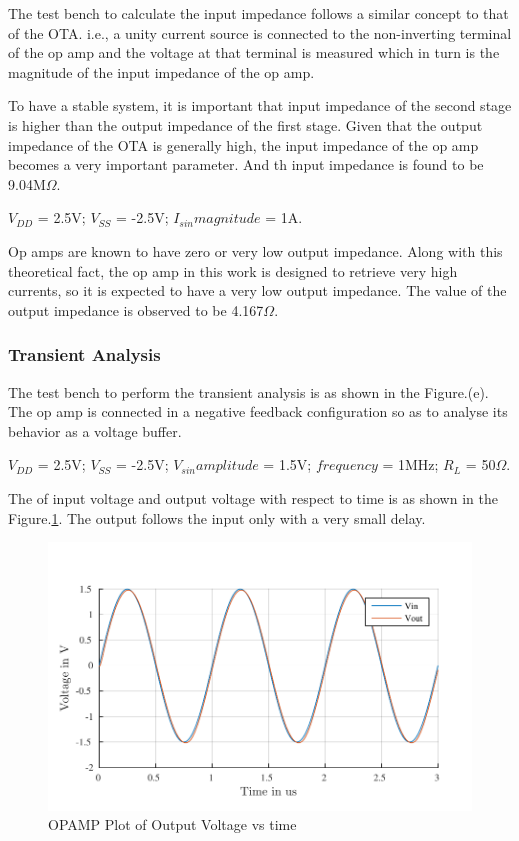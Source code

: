 The test bench to calculate the input impedance follows a similar concept to that of the OTA. i.e., a unity current source is connected to the non-inverting terminal of the op amp and the voltage at that terminal is measured which in turn is the magnitude of the input impedance of the op amp.

To have a stable system, it is important that input impedance of the second stage is higher than the output impedance of the first stage. Given that the output impedance of the OTA is generally high, the input impedance of the op amp becomes a very important parameter. And th input impedance is found to be 9.04M$\Omega$.

$V_{DD}$ = 2.5V; $V_{SS}$ = -2.5V; $I_{sin} magnitude $ = 1A.

Op amps are known to have zero or very low output impedance. Along with this theoretical fact, the op amp in this work is designed to retrieve very high currents, so it is expected to have a very low output impedance. The value of the output impedance is observed to be 4.167$\Omega$.

\subsubsection{Transient Analysis}
The test bench to perform the transient analysis is as shown in the Figure.(e). The op amp is connected in a negative feedback configuration so as to analyse its behavior as a voltage buffer.

$V_{DD}$ = 2.5V; $V_{SS}$ = -2.5V; $V_{sin} amplitude $ = 1.5V; $frequency$ = 1MHz; $R_L$ = 50$\Omega$.

The of input voltage and output voltage with respect to time is as shown in the Figure.\ref{fig:OPAMP_Vout}. The output follows the input only with a very small delay.

\begin{figure} [H]
\centering
\includegraphics[scale=1]{Figures/Plots/OPAMP_Buffer.pdf}
\caption{OPAMP Plot of Output Voltage vs time}
\label{fig:OPAMP_Vout}
\end{figure}

